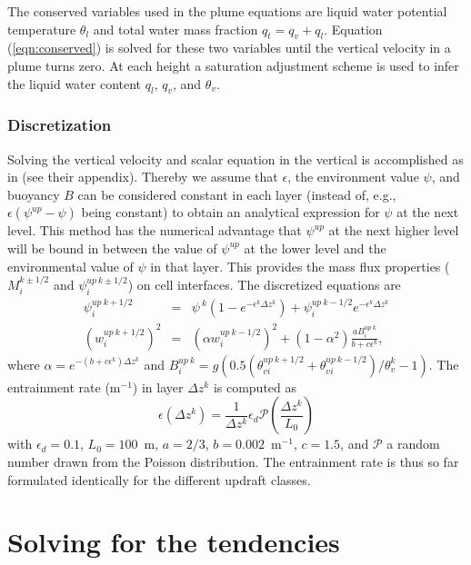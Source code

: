 \documentclass[dvipdfmx,a4paper,10pt]{article}
\begin{document}
The conserved variables used in the plume equations are liquid water potential temperature $\theta_l$ and total water mass fraction $q_t=q_v+q_l$. Equation (\ref{eqn:conserved}) is solved for these two variables until the vertical velocity in a plume turns zero. At each height a saturation adjustment scheme is used to infer the liquid water content $q_l$, $q_v$, and $\theta_v$. 


\subsubsection{Discretization}
Solving the vertical velocity and scalar equation in the vertical is accomplished as in \cite{suselj14} (see their appendix). Thereby we assume that $\epsilon$, the environment value $\psi$, and buoyancy $B$ can be considered constant in each layer (instead of, e.g., $\epsilon(\psi^{up}-\psi)$ being constant) to obtain an analytical expression for $\psi$ at the next level. This method has the numerical advantage that $\psi^{up}$ at the next higher level will be bound in between the value of $\psi^{up}$ at the lower level and the environmental value of $\psi$ in that layer. This provides the mass flux properties ($M_i^{k\pm 1/2}$ and $\psi^{up~k\pm 1/2}_i$) on cell interfaces. The discretized equations are 
\begin{eqnarray}
 \psi_i^{up~k+1/2}&=&\psi^{~k}(1-e^{-\epsilon^{k}\Delta z^k})+\psi_i^{up~k-1/2}e^{-\epsilon^{k}\Delta z^k}\\
 (w_i^{up~k+1/2})^2&=&(\alpha w_i^{up~k-1/2})^2 + (1-\alpha^2) \frac{aB_i^{up~k}}{b+c\epsilon^k},
\end{eqnarray}
where $\alpha=e^{-(b+c\epsilon^k)\Delta z^k}$ and $B_i^{up~k}=g(0.5(\theta_{vi}^{up~k+1/2}+\theta_{vi}^{up~k-1/2})/\theta_v^{k}-1)$. The entrainment rate (m$^{-1}$) in layer $\Delta z^k$ is computed as
\begin{equation}
 \epsilon(\Delta z^k) = \frac{1}{\Delta z^k} \epsilon_d \mathcal{P}(\frac{\Delta z^k}{L_0})
\end{equation}
with $\epsilon_d=0.1$, $L_0=100$~m, $a=2/3$, $b=0.002$~m$^{-1}$, $c=1.5$, and $\mathcal{P}$ a random number drawn from the Poisson distribution. The entrainment rate is thus so far formulated identically for the different updraft classes. 

\section{Solving for the tendencies}\label{sec:solve}
\end{document}
